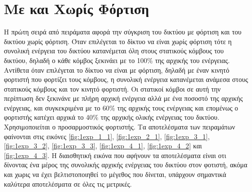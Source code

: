 \section{Με και Χωρίς Φόρτιση}
Η πρώτη σειρά από πειράματα αφορά την σύγκριση του δικτύου με φόρτιση και του δικτύου χωρίς φόρτιση. Όταν επιλέγεται το δίκτυο να είναι χωρίς φόρτιση τότε η συνολική
ενέργεια του δικτύου κατανέμεται όλη στους στατικούς κόμβους του δικτύου, δηλαδή ο κάθε κόμβος ξεκινάει με το 100\% της αρχικής του ενέργειας. Αντίθετα όταν
επιλέγεται το δίκτυο να είναι με φόρτιση, δηλαδή με έναν κινητό φορτιστή που φορτίζει τους κόμβους, η συνολική ενέργεια κατανέμεται ανάμεσα στους στατικούς κόμβους
και τον κινητό φορτιστή. Οι στατικοί κόμβοι σε αυτή την περίπτωση δεν ξεκινάνε με πλήρη αρχική ενέργεια αλλά με ένα ποσοστό της αρχικής ενέργειας, και συγκεκριμένα
με το 60\% της αρχικής τους ενέργειας και επομένως ο φορτιστής κατέχει αρχικά το 40\% της αρχικής ολικής ενέργειας του δικτύου. Χρησιμοποιείται ο προσαρμοστικός
φορτιστής. Τα αποτελέσματα των πειραμάτων φαίνονται στις εικόνες \ref{fig:1exp_1_1}, \ref{fig:1exp_2_1}, \ref{fig:1exp_3_1}, \ref{fig:1exp_3_2}, \ref{fig:1exp_3_3},
\ref{fig:1exp_4_1}, \ref{fig:1exp_4_2} και \ref{fig:1exp_4_3}. Η διαισθητική εικόνα που αφήνουν τα αποτελέσματα είναι οτι δίνοντας ένα μέρος της
συνολικής αρχικής ενέργειας του δικτύου στον φοτιστή, ακόμα και χωρις να έχει βελτιστοποιηθεί το μέγεθος που δίνεται, υπάρχουν σημαντικά καλύτερα αποτελέσματα σε
όλες τις μετρικές.



